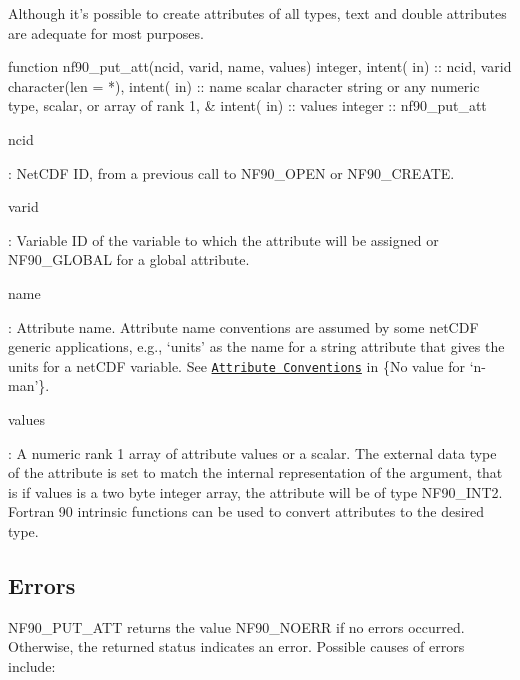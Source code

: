 Although it’s possible to create attributes of all types, text and double attributes are adequate for most purposes.


\begin{DoxyCode}
\textcolor{keyword}{function }nf90\_put\_att(ncid, varid, name, values)
  \textcolor{keywordtype}{integer},            \textcolor{keywordtype}{intent( in)} :: ncid, varid
  \textcolor{keywordtype}{character(len = *)}, \textcolor{keywordtype}{intent( in)} :: name
  scalar \textcolor{keywordtype}{character} string or any numeric \textcolor{keywordtype}{type}, scalar, or array of rank 1, &
                      \textcolor{keywordtype}{intent( in)} :: values
  \textcolor{keywordtype}{integer}                         :: nf90\_put\_att
\end{DoxyCode}


{\ttfamily ncid}

\+: Net\+C\+DF ID, from a previous call to N\+F90\+\_\+\+O\+P\+EN or N\+F90\+\_\+\+C\+R\+E\+A\+TE.

{\ttfamily varid}

\+: Variable ID of the variable to which the attribute will be assigned or N\+F90\+\_\+\+G\+L\+O\+B\+AL for a global attribute.

{\ttfamily name}

\+: Attribute name. Attribute name conventions are assumed by some net\+C\+DF generic applications, e.\+g., ‘units’ as the name for a string attribute that gives the units for a net\+C\+DF variable. See \href{netcdf.html#Attribute-Conventions}{\tt Attribute Conventions} in \{No value for ‘n-\/man’\}.

{\ttfamily values}

\+: A numeric rank 1 array of attribute values or a scalar. The external data type of the attribute is set to match the internal representation of the argument, that is if values is a two byte integer array, the attribute will be of type N\+F90\+\_\+\+I\+N\+T2. Fortran 90 intrinsic functions can be used to convert attributes to the desired type.

\subsection*{Errors}

N\+F90\+\_\+\+P\+U\+T\+\_\+\+A\+TT returns the value N\+F90\+\_\+\+N\+O\+E\+RR if no errors occurred. Otherwise, the returned status indicates an error. Possible causes of errors include\+:


